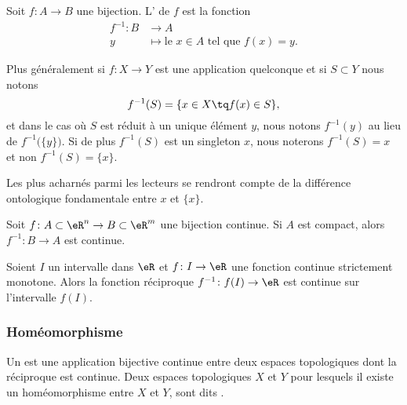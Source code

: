 \begin{definition}      \label{DEFooTRGYooRxORpY}
    Soit \( f\colon A\to B\) une bijection. L' de \( f\) est la fonction
    \begin{equation}
        \begin{aligned}
            f^{-1}\colon B&\to A \\
            y&\mapsto \text{le } x\in A\text{ tel que } f(x)=y.
        \end{aligned}
    \end{equation}
\end{definition}

Plus généralement si \( f\colon X\to Y\) est une application quelconque et si \( S\subset Y\) nous notons
\begin{equation}
    f^{-1}(S)=\{ x\in X\tq f(x)\in S \},
\end{equation}
et dans le cas où \( S\) est réduit à un unique élément \( y\), nous notons \( f^{-1}(y)\) au lieu de \( f^{-1}\big( \{ y \} \big)\). Si de plus \( f^{-1}(S)\) est un singleton \( x\), nous noterons \( f^{-1}(S)=x\) et non \( f^{-1}(S)=\{ x \}\).

Les plus acharnés parmi les lecteurs se rendront compte de la différence ontologique fondamentale entre \( x\) et \( \{ x \}\).

\begin{proposition}	\label{PropoInvCompCont}
Soit $f\colon A\subset\eR^n\to B\subset\eR^m$ une bijection continue. Si $A$ est compact, alors $f^{-1}\colon B\to A$ est continue.
\end{proposition}

\begin{proposition}		\label{PropIntContMOnIvCont}
Soient $I$ un intervalle dans $\eR$ et $f\colon I\to \eR$ une fonction continue strictement monotone. Alors la fonction réciproque $f^{-1}\colon f(I)\to \eR$ est continue sur l'intervalle $f(I)$.
\end{proposition}

\subsubsection{Homéomorphisme}

\begin{definition}[homéomorphisme]      \label{DEFooYPGQooMAObTO}
    Un  est une application bijective continue entre deux espaces topologiques dont la réciproque est continue. Deux espaces topologiques $X$ et $Y$ pour lesquels il existe un homéomorphisme entre $X$ et $Y$, sont dits .
\end{definition}

